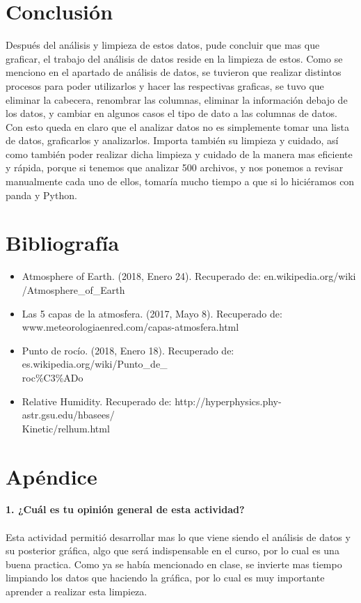 \documentclass[12pt]{article}
\begin{document}
\section{Conclusión}
Después del análisis y limpieza de estos datos, pude concluir que mas que graficar, el trabajo del análisis de datos reside en la limpieza de estos. Como se menciono en el apartado de análisis de datos, se tuvieron que realizar distintos procesos para poder utilizarlos y hacer las respectivas graficas, se tuvo que eliminar la cabecera, renombrar las columnas, eliminar la información debajo de los datos, y cambiar en algunos casos el tipo de dato a las columnas de datos. \\

Con esto queda en claro que el analizar datos no es simplemente tomar una lista de datos, graficarlos y analizarlos. Importa también su limpieza y cuidado, así como también poder realizar dicha limpieza y cuidado de la manera mas eficiente y rápida, porque si tenemos que analizar 500 archivos, y nos ponemos a revisar manualmente cada uno de ellos, tomaría mucho tiempo a que si lo hiciéramos con panda y Python.

\section{Bibliografía}
\begin{itemize}
    \item Atmosphere of Earth. (2018, Enero 24). Recuperado de: en.wikipedia.org/wiki \\ /Atmosphere\_of\_Earth
    \item Las 5 capas de la atmosfera. (2017, Mayo 8). Recuperado de: www.meteorologiaenred.com/capas-atmosfera.html
    \item Punto de rocío. (2018, Enero 18). Recuperado de: es.wikipedia.org/wiki/Punto\_de\_\\roc\%C3\%ADo
    \item Relative Humidity. Recuperado de: http://hyperphysics.phy-astr.gsu.edu/hbasees/\\Kinetic/relhum.html
\end{itemize}

\section{Apéndice}
\noindent\textbf {1. ¿Cuál es tu opinión general de esta actividad?} \\ \\
Esta actividad permitió desarrollar mas lo que viene siendo el análisis de datos y su posterior gráfica, algo que será indispensable en el curso, por lo cual es una buena practica. Como ya se había mencionado en clase, se invierte mas tiempo limpiando los datos que haciendo la gráfica, por lo cual es muy importante aprender a realizar esta limpieza.  \\ \\
\end{document}
